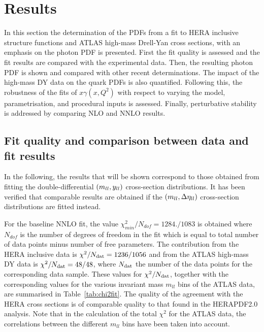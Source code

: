 \section{Results}
\label{sec:results}

In this section the
determination of the PDFs from a fit to 
HERA inclusive structure functions and ATLAS high-mass Drell-Yan cross sections,
with an emphasis on the photon PDF is presented.
%
First the fit quality is assessed and the fit results are compared 
with the experimental data.
%
Then, the resulting photon PDF is shown and compared with other
recent determinations.
%
The impact of the high-mass DY data on
the quark PDFs is also quantified.
%
Following this,
the robustness of the fits of $x\gamma(x,Q^2)$
with respect to varying the model, parametrisation, and procedural
inputs is assessed.
%
Finally, perturbative stability is addressed by comparing NLO and
NNLO results.

\subsection{Fit quality and comparison between data and fit results}

In the following, the results that will be shown
correspond to those obtained from fitting the
double-differential $\left( m_{ll},y_{ll}\right)$ cross-section distributions.
%
It has been verified that comparable results are obtained if the
$\left( m_{ll},\Delta\eta_{ll}\right)$ cross-section distributions are fitted instead.

For the baseline NNLO fit, the value $\chi^2_{min}/N_{dof} =
1284./1083$ is obtained where $N_{dof}$ is the number of degrees of
freedom in the fit which is equal to total number of data points minus
number of free parameters.
%
The contribution from the HERA inclusive  data is 
$\chi^{2}/N_{\rm dat} = 1236/1056$ and
from the ATLAS high-mass DY data is $\chi^2/N_{\rm dat} = 48/48$,
where  $N_{\rm dat}$ the number of the data points for the corresponding
data sample.
%
These values for  $\chi^{2}/N_{\rm dat}$, together
with the corresponding values for the various
invariant mass $m_{ll}$ bins of the ATLAS  data,
are summarised in
Table~\ref{tab:chi2fit}.
%
The quality of the agreement with the HERA cross sections is of comparable quality to that found in the HERAPDF2.0 analysis.
%
Note that in the calculation of the total $\chi^2$ for the
ATLAS data, the correlations between the
different $m_{ll}$ bins have been taken into account.

